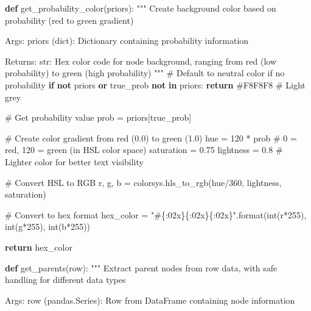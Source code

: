 \documentclass[
  11pt,
  letterpaper,
]{book}
\newenvironment{Shaded}{\begin{snugshade}}{\end{snugshade}}
\newcommand{\BuiltInTok}[1]{\textcolor[rgb]{0.00,0.23,0.31}{#1}}
\newcommand{\CommentTok}[1]{\textcolor[rgb]{0.37,0.37,0.37}{#1}}
\newcommand{\ControlFlowTok}[1]{\textcolor[rgb]{0.00,0.23,0.31}{\textbf{#1}}}
\newcommand{\DecValTok}[1]{\textcolor[rgb]{0.68,0.00,0.00}{#1}}
\newcommand{\FloatTok}[1]{\textcolor[rgb]{0.68,0.00,0.00}{#1}}
\newcommand{\KeywordTok}[1]{\textcolor[rgb]{0.00,0.23,0.31}{\textbf{#1}}}
\newcommand{\NormalTok}[1]{\textcolor[rgb]{0.00,0.23,0.31}{#1}}
\newcommand{\OperatorTok}[1]{\textcolor[rgb]{0.37,0.37,0.37}{#1}}
\newcommand{\SpecialCharTok}[1]{\textcolor[rgb]{0.37,0.37,0.37}{#1}}
\newcommand{\StringTok}[1]{\textcolor[rgb]{0.13,0.47,0.30}{#1}}
\begin{document}
\begin{Shaded}
\begin{Highlighting}[]
\KeywordTok{def}\NormalTok{ get\_probability\_color(priors):}
    \CommentTok{"""}
\CommentTok{    Create background color based on probability (red to green gradient)}

\CommentTok{    Args:}
\CommentTok{        priors (dict): Dictionary containing probability information}

\CommentTok{    Returns:}
\CommentTok{        str: Hex color code for node background, ranging from red (low probability)}
\CommentTok{             to green (high probability)}
\CommentTok{    """}
    \CommentTok{\# Default to neutral color if no probability}
    \ControlFlowTok{if} \KeywordTok{not}\NormalTok{ priors }\KeywordTok{or} \StringTok{\textquotesingle{}true\_prob\textquotesingle{}} \KeywordTok{not} \KeywordTok{in}\NormalTok{ priors:}
        \ControlFlowTok{return} \StringTok{\textquotesingle{}\#F8F8F8\textquotesingle{}}  \CommentTok{\# Light grey}

    \CommentTok{\# Get probability value}
\NormalTok{    prob }\OperatorTok{=}\NormalTok{ priors[}\StringTok{\textquotesingle{}true\_prob\textquotesingle{}}\NormalTok{]}

    \CommentTok{\# Create color gradient from red (0.0) to green (1.0)}
\NormalTok{    hue }\OperatorTok{=} \DecValTok{120} \OperatorTok{*}\NormalTok{ prob  }\CommentTok{\# 0 = red, 120 = green (in HSL color space)}
\NormalTok{    saturation }\OperatorTok{=} \FloatTok{0.75}
\NormalTok{    lightness }\OperatorTok{=} \FloatTok{0.8}  \CommentTok{\# Lighter color for better text visibility}

    \CommentTok{\# Convert HSL to RGB}
\NormalTok{    r, g, b }\OperatorTok{=}\NormalTok{ colorsys.hls\_to\_rgb(hue}\OperatorTok{/}\DecValTok{360}\NormalTok{, lightness, saturation)}

    \CommentTok{\# Convert to hex format}
\NormalTok{    hex\_color }\OperatorTok{=} \StringTok{"\#}\SpecialCharTok{\{:02x\}\{:02x\}\{:02x\}}\StringTok{"}\NormalTok{.}\BuiltInTok{format}\NormalTok{(}\BuiltInTok{int}\NormalTok{(r}\OperatorTok{*}\DecValTok{255}\NormalTok{), }\BuiltInTok{int}\NormalTok{(g}\OperatorTok{*}\DecValTok{255}\NormalTok{), }\BuiltInTok{int}\NormalTok{(b}\OperatorTok{*}\DecValTok{255}\NormalTok{))}

    \ControlFlowTok{return}\NormalTok{ hex\_color}

\KeywordTok{def}\NormalTok{ get\_parents(row):}
    \CommentTok{"""}
\CommentTok{    Extract parent nodes from row data, with safe handling for different data types}

\CommentTok{    Args:}
\CommentTok{        row (pandas.Series): Row from DataFrame containing node information}


\end{Highlighting}
\end{Shaded}
\end{document}

